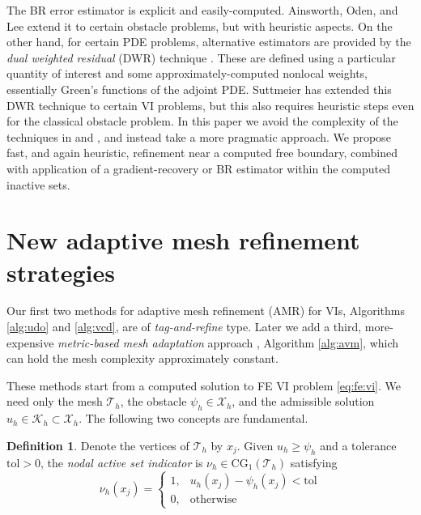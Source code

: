 \documentclass[]{interact}
\theoremstyle{plain}%
\theoremstyle{definition}
\newtheorem{definition}[theorem]{Definition}
\theoremstyle{remark}
\newcommand{\cK}{\mathcal{K}}
\newcommand{\cT}{\mathcal{T}}
\newcommand{\cX}{\mathcal{X}}
\newcommand{\CG}{\text{CG}}
\begin{document}
The BR error estimator is explicit and easily-computed.  Ainsworth, Oden, and Lee \cite{AinsworthOdenLee1993} extend it to certain obstacle problems, but with heuristic aspects.  On the other hand, for certain PDE problems, alternative estimators are provided by the \emph{dual weighted residual} (DWR) technique \cite{BangerthRannacher2003}.  These are defined using a particular quantity of interest and some approximately-computed nonlocal weights, essentially Green's functions of the adjoint PDE.  Suttmeier \cite{Suttmeier2008} has extended this DWR technique to certain VI problems, but this also requires heuristic steps even for the classical obstacle problem.  In this paper we avoid the complexity of the techniques in \cite{AinsworthOdenLee1993} and \cite{Suttmeier2008}, and instead take a more pragmatic approach.  We propose fast, and again heuristic, refinement near a computed free boundary, combined with application of a gradient-recovery or BR estimator within the computed inactive sets.


\section{New adaptive mesh refinement strategies} \label{sec:viamr}

Our first two methods for adaptive mesh refinement (AMR) for VIs, Algorithms \ref{alg:udo} and \ref{alg:vcd}, are of \emph{tag-and-refine} type.  Later we add a third, more-expensive \emph{metric-based mesh adaptation} approach \cite{Wallworketal2020}, Algorithm \ref{alg:avm}, which can hold the mesh complexity approximately constant.

These methods start from a computed solution to FE VI problem \eqref{eq:fe:vi}.  We need only the mesh $\cT_h$, the obstacle $\psi_h \in \cX_h$, and the admissible solution $u_h \in \cK_h \subset \cX_h$.  The following two concepts are fundamental.

\begin{definition} \label{def:nodalactive}
Denote the vertices of $\cT_h$ by $x_j$.  Given $u_h \ge \psi_h$ and a tolerance $\text{tol}>0$, the \emph{nodal active set indicator} is $\nu_h\in\CG_1(\cT_h)$ satisfying
	$$\nu_h(x_j) = \begin{cases} 1, & u_h(x_j) - \psi_h(x_j) < \text{tol} \\
	                             0, & \text{otherwise}\end{cases}$$
\end{definition}
\end{document}
